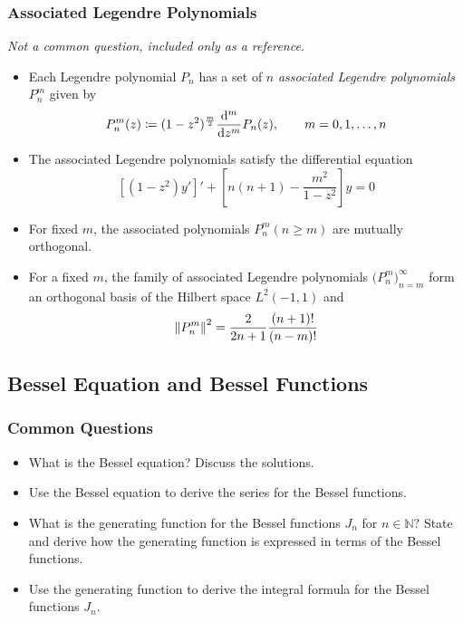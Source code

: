 \documentclass[11pt, a4paper]{article}
\newcommand{\question}[1]{\textit{#1}\vspace{2mm}}
\begin{document}
\subsubsection{Associated Legendre Polynomials}
\question{Not a common question, included only as a reference.}
\begin{itemize}
	\item Each Legendre polynomial $ P_n $ has a set of $ n $  \textit{associated Legendre polynomials} $ P_{n}^{m} $  given by
	\begin{equation*}
		P_{n}^{m}(z) \coloneqq (1 - z^2)^{\frac{m}{2}}\dv[m]{}{z}P_n(z), \qquad m = 0, 1, \dots, n
	\end{equation*}
	
	\item The associated Legendre polynomials satisfy the differential equation
	\begin{equation*}
		\left[(1- z^2)y'\right]' + \left[n(n+1)-\frac{m^2}{1-z^2}\right]y = 0
	\end{equation*}
	
	\item For fixed $ m $, the associated polynomials $ P_{n}^{m}(n \geq m) $ are mutually orthogonal.
	
	\item For a fixed $ m $, the family of associated Legendre polynomials $ \big(P_{n}^{m}\big)_{n=m}^{\infty} $ form an orthogonal basis of the Hilbert space $ L^2(-1, 1)  $ and
	\begin{equation*}
		\norm{P_{n}^{m}}^2 = \frac{2}{2n + 1}\frac{(n+1)!}{(n-m)!}
	\end{equation*}
	
\end{itemize}


\subsection{Bessel Equation and Bessel Functions}

\subsubsection{Common Questions}
\begin{itemize}
	\item What is the Bessel equation? Discuss the solutions.
	
	\item Use the Bessel equation to derive the series for the Bessel functions.
	
	\item What is the generating function for the Bessel functions $ J_{n} $ for $ n \in \mathbb{N} $? State and derive how the generating function is expressed in terms of the Bessel functions.
	
	
	\item Use the generating function to derive the integral formula for the Bessel functions $ J_{n} $.
	

\end{itemize}
\end{document}
